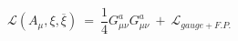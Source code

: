 \begin{equation}\label{1}
\mathcal{L}(A_{\mu},\xi,\overline{\xi}) ~=~
\frac{1}{4}G_{\mu\nu}^{a} G_{\mu\nu}^{a} ~+~
\mathcal{L}_{gauge+F.P.}
\end{equation}

